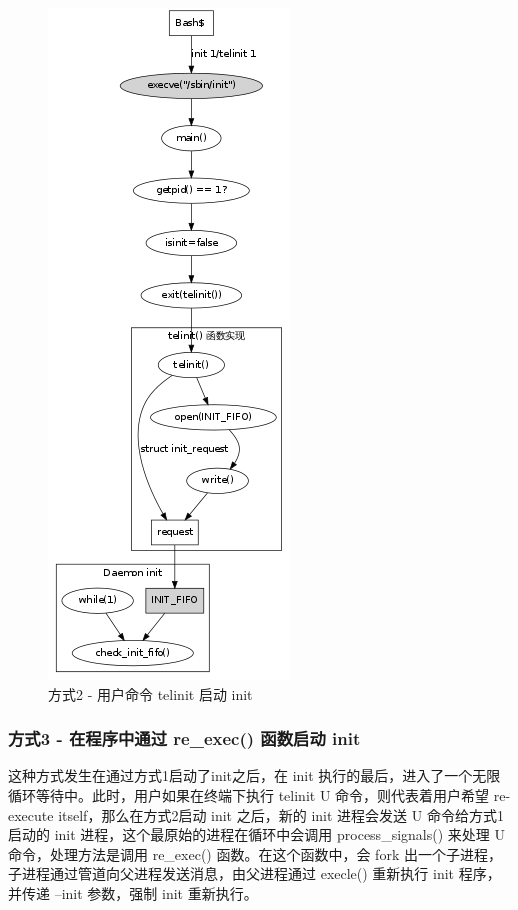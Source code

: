 \begin{figure}[htbp]
\centering
\includegraphics{./figures/how-to-exec-init-2.png}
\caption{方式2 - 用户命令 telinit 启动 init}
\end{figure}

\subsubsection{方式3 - 在程序中通过 re\_exec() 函数启动 init}

这种方式发生在通过方式1启动了init之后，在 init
执行的最后，进入了一个无限循环等待中。此时，用户如果在终端下执行 telinit U
命令，则代表着用户希望 re-execute itself，那么在方式2启动 init 之后，新的
init 进程会发送 U 命令给方式1启动的 init
进程，这个最原始的进程在循环中会调用 process\_signals() 来处理 U
命令，处理方法是调用 re\_exec() 函数。在这个函数中，会 fork
出一个子进程，子进程通过管道向父进程发送消息，由父进程通过 execle()
重新执行 init 程序，并传递 --init 参数，强制 init 重新执行。


